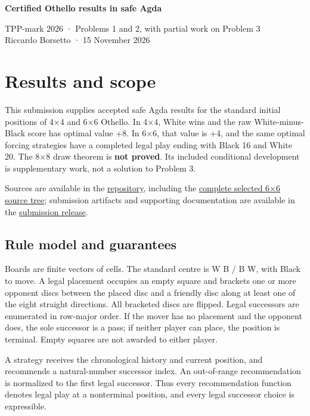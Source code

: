 \documentclass[10pt,a4paper]{article}
\begin{document}
\RaggedRight
\begin{center}
{\LARGE\bfseries Certified Othello results in safe Agda}\par
\vspace{3mm}
TPP-mark 2026 · Problems 1 and 2, with partial work on Problem 3\\
Riccardo Borsetto · 15 November 2026
\end{center}
\section{Results and scope}

This submission supplies accepted safe Agda results for the standard initial positions of 4×4 and 6×6 Othello. In 4×4, White wins and the raw White-minus-Black score has optimal value +8. In 6×6, that value is +4, and the same optimal forcing strategies have a completed legal play ending with Black 16 and White 20. The 8×8 draw theorem is \textbf{not proved}. Its included conditional development is supplementary work, not a solution to Problem 3.

Sources are available in the \href{https://github.com/eapiova/othello-agda}{repository}, including the \href{https://github.com/eapiova/othello-agda/tree/main/six-complete}{complete selected 6×6 source tree}; submission artifacts and supporting documentation are available in the \href{https://github.com/eapiova/othello-agda/releases/tag/tpp2026-submission-20261115}{submission release}.

\subsection{Rule model and guarantees}

Boards are finite vectors of cells. The standard centre is W B / B W, with Black to move. A legal placement occupies an empty square and brackets one or more opponent discs between the placed disc and a friendly disc along at least one of the eight straight directions. All bracketed discs are flipped. Legal successors are enumerated in row-major order. If the mover has no placement and the opponent does, the sole successor is a pass; if neither player can place, the position is terminal. Empty squares are not awarded to either player.

A strategy receives the chronological history and current position, and recommends a natural-number successor index. An out-of-range recommendation is normalized to the first legal successor. Thus every recommendation function denotes legal play at a nonterminal position, and every legal successor choice is expressible.
\end{document}
